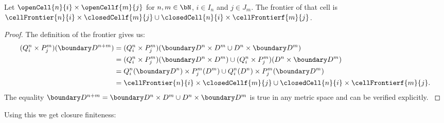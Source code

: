 \begin{lem}
    Let $\openCell{n}{i} \times \openCellf{m}{j}$ for $n, m \in \bN$, $i \in I_n$ and $j \in J_m$. 
    The frontier of that cell is $\cellFrontier{n}{i} \times \closedCellf{m}{j} \cup \closedCell{n}{i} \times \cellFrontierf{m}{j}$. 
    \href{https://github.com/scholzhannah/CWComplexes/blob/7be4872a05b534011cc969eb5b80a4b7f0bf57e2/CWcomplexes/Product.lean#L65-L70}{\faExternalLink}
\end{lem}
\begin{proof}
    The definition of the frontier gives us: 
    \begin{equation*}
        \begin{split}
            (Q_i^n \times P_j^m) (\boundary D^{n + m}) &=  (Q_i^n \times P_j^m) (\boundary D^n \times D^m \cup D^n \times \boundary D^m) \\
            &= (Q_i^n \times P_j^m) (\boundary D^n \times D^m) \cup (Q_i^n \times P_j^m) (D^n \times \boundary D^m) \\
            &= Q_i^n(\boundary D^n) \times P_j^m(D^m) \cup Q_i^n (D^n) \times P_j^m (\boundary D^m) \\
            &= \cellFrontier{n}{i} \times \closedCellf{m}{j} \cup \closedCell{n}{i} \times \cellFrontierf{m}{j}.
        \end{split}
    \end{equation*}
    The equality $\boundary D^{n + m} = \boundary D^n \times D^m \cup D^n \times \boundary D^m$ is true in any metric space and can be verified explicitly. 
    \href{https://github.com/leanprover-community/mathlib4/blob/93828f4cd10fb8cab31700b110fd2751d36bf1b8/Mathlib/Topology/MetricSpace/Pseudo/Constructions.lean#L171-L181}{\faExternalLink}
\end{proof}

Using this we get closure finiteness:

